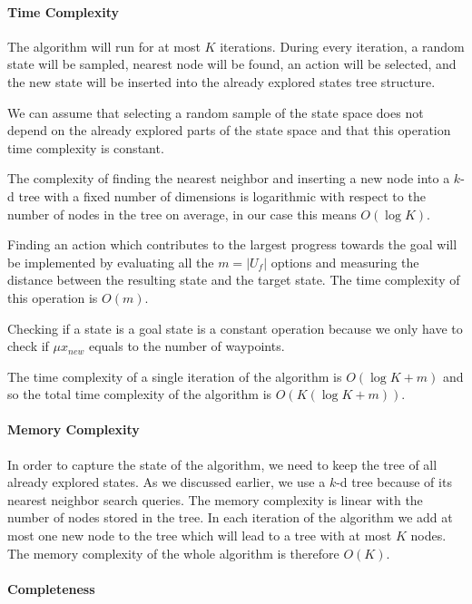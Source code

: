 \paragraph{Time Complexity}

The algorithm will run for at most $K$ iterations. During every iteration, a random state will be sampled, nearest node will be found, an action will be selected, and the new state will be inserted into the already explored states tree structure.

We can assume that selecting a random sample of the state space does not depend on the already explored parts of the state space and that this operation time complexity is constant.

The complexity of finding the nearest neighbor and inserting a new node into a $k$-d tree with a fixed number of dimensions is logarithmic with respect to the number of nodes in the tree on average, in our case this means $O(\log K)$.

Finding an action which contributes to the largest progress towards the goal will be implemented by evaluating all the $m=|U_f|$ options and measuring the distance between the resulting state and the target state. The time complexity of this operation is $O(m)$.

Checking if a state is a goal state is a constant operation because we only have to check if $\mu{x_{new}}$ equals to the number of waypoints.

The time complexity of a single iteration of the algorithm is $O(\log K + m)$ and so the total time complexity of the algorithm is $O\left(K(\log K+m)\right)$.

\paragraph{Memory Complexity}

In order to capture the state of the algorithm, we need to keep the tree of all already explored states. As we discussed earlier, we use a $k$-d tree because of its nearest neighbor search queries. The memory complexity is linear with the number of nodes stored in the tree. In each iteration of the algorithm we add at most one new node to the tree which will lead to a tree with at most $K$ nodes. The memory complexity of the whole algorithm is therefore $O(K)$.

\paragraph{Completeness}

